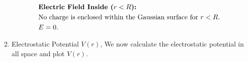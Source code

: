 \documentclass[12pt]{article}
\begin{document}
\begin{correctionbox}
\begin{enumerate}
		      \begin{align*}
			       & \textbf{Electric Field Inside ($ r < R $):}                          \\
			       & \text{No charge is enclosed within the Gaussian surface for } r < R. \\
			       & E = 0.
		      \end{align*}
		\item Electrostatic Potential $ V(r) $,
		      We now calculate the electrostatic potential in all space and plot $ V(r) $.
















	\end{enumerate}
\end{correctionbox}
\end{document}
